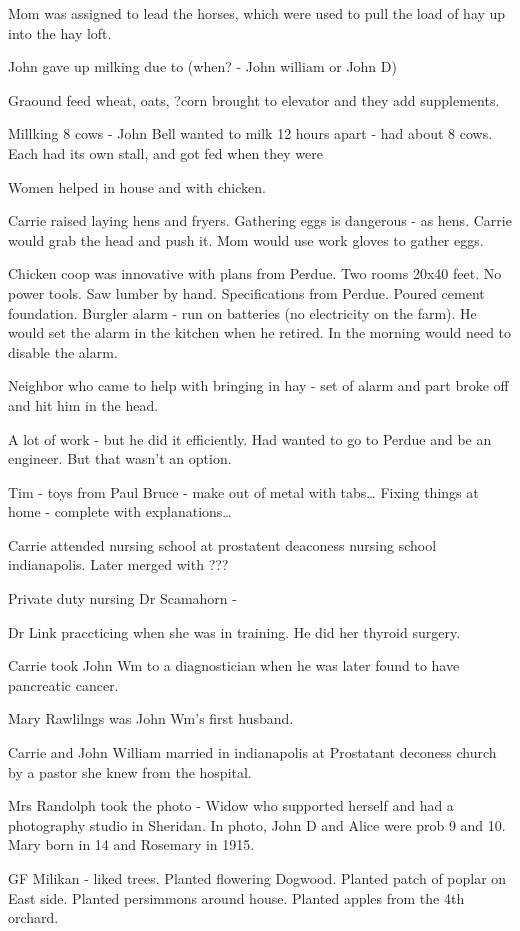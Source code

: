 \documentclass[
]{book}
\begin{document}
Mom was assigned to lead the horses, which were used to pull the load of hay up into the hay loft.

John gave up milking due to (when? - John william or John D)

Graound feed wheat, oats, ?corn brought to elevator and they add supplements.

Millking 8 cows - John Bell wanted to milk 12 hours apart - had about 8 cows. Each had its own stall, and got fed when they were

Women helped in house and with chicken.

Carrie raised laying hens and fryers. Gathering eggs is dangerous - as hens. Carrie would grab the head and push it. Mom would use work gloves to gather eggs.

Chicken coop was innovative with plans from Perdue. Two rooms 20x40 feet. No power tools. Saw lumber by hand. Specifications from Perdue. Poured cement foundation. Burgler alarm - run on batteries (no electricity on the farm). He would set the alarm in the kitchen when he retired. In the morning would need to disable the alarm.

Neighbor who came to help with bringing in hay - set of alarm and part broke off and hit him in the head.

A lot of work - but he did it efficiently. Had wanted to go to Perdue and be an engineer. But that wasn't an option.

Tim - toys from Paul Bruce - make out of metal with tabs\ldots{} Fixing things at home - complete with explanations\ldots{}

Carrie attended nursing school at prostatent deaconess nursing school indianapolis. Later merged with ???

Private duty nursing Dr Scamahorn -

Dr Link praccticing when she was in training. He did her thyroid surgery.

Carrie took John Wm to a diagnostician when he was later found to have pancreatic cancer.

Mary Rawlilngs was John Wm's first husband.

Carrie and John William married in indianapolis at Prostatant deconess church by a pastor she knew from the hospital.

Mrs Randolph took the photo - Widow who supported herself and had a photography studio in Sheridan. In photo, John D and Alice were prob 9 and 10. Mary born in 14 and Rosemary in 1915.

GF Milikan - liked trees. Planted flowering Dogwood. Planted patch of poplar on East side. Planted persimmons around house. Planted apples from the 4th orchard.
\end{document}
